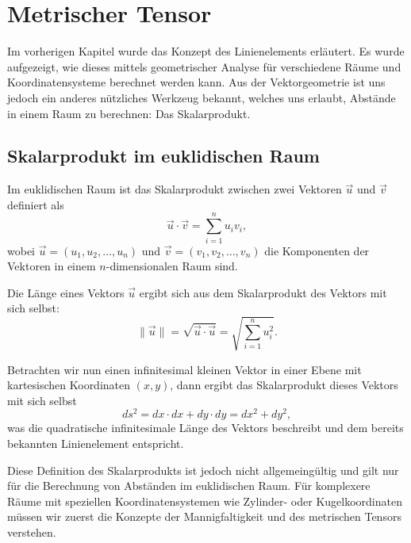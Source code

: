%
%
%
\section{Metrischer Tensor
\label{geodaeten:section:MetrischerTensor}}

Im vorherigen Kapitel wurde das Konzept des Linienelements erläutert.
Es wurde aufgezeigt, wie dieses mittels geometrischer Analyse für verschiedene Räume und Koordinatensysteme berechnet werden kann.
Aus der Vektorgeometrie ist uns jedoch ein anderes nützliches Werkzeug bekannt, welches uns erlaubt, Abstände in einem Raum zu berechnen: Das Skalarprodukt.

\subsection{Skalarprodukt im euklidischen Raum}

Im euklidischen Raum ist das Skalarprodukt zwischen zwei Vektoren $\vec{u}$ und $\vec{v}$ definiert als
\begin{equation}
	\vec{u} \cdot \vec{v} = \sum_{i=1}^n u_i v_i,
\end{equation}
wobei $\vec{u} = (u_1, u_2, \ldots, u_n)$ und $\vec{v} = (v_1, v_2, \ldots, v_n)$ die Komponenten der Vektoren in einem $n$-dimensionalen Raum sind.

Die Länge eines Vektors $\vec{u}$ ergibt sich aus dem Skalarprodukt des Vektors mit sich selbst:
\begin{equation}
	\|\vec{u}\| = \sqrt{\vec{u} \cdot \vec{u}} = \sqrt{\sum_{i=1}^n u_i^2}. 
\end{equation}

Betrachten wir nun einen infinitesimal kleinen Vektor in einer Ebene mit kartesischen Koordinaten $(x, y)$, dann ergibt das Skalarprodukt dieses Vektors mit sich selbst
\begin{equation}
	ds^2 = dx \cdot dx + dy \cdot dy = dx^2 + dy^2,
\end{equation}
was die quadratische infinitesimale Länge des Vektors beschreibt und dem bereits bekannten Linienelement entspricht.

Diese Definition des Skalarprodukts ist jedoch nicht allgemeingültig und gilt nur für die Berechnung von Abständen im euklidischen Raum.
Für komplexere Räume mit speziellen Koordinatensystemen wie Zylinder- oder Kugelkoordinaten müssen wir zuerst die Konzepte der Mannigfaltigkeit und des metrischen Tensors verstehen.

